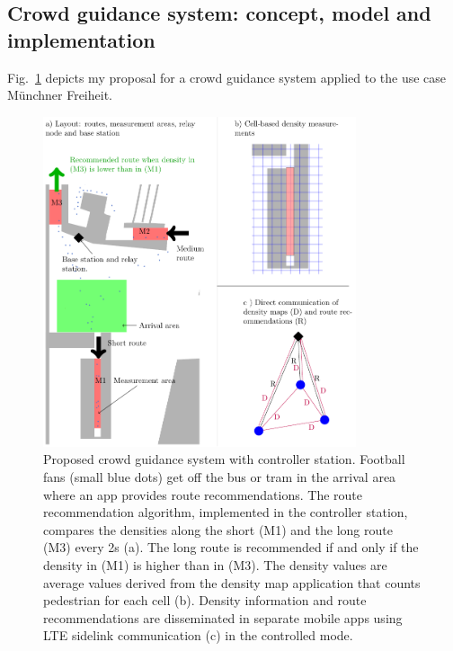 \subsection{Crowd guidance system: concept, model and implementation}

Fig.~\ref{fig:zentralesSzenario} depicts my proposal for a crowd guidance system applied to the use case Münchner Freiheit.  

\begin{figure}[hbt!]
\includegraphics[width=0.82\textwidth]{../figures/investigation/RealisticScenario/conceptFinal.pdf} 
\caption[Proposed crowd guidance system with relay station]{Proposed crowd guidance system with controller station. Football fans (small blue dots) get off the bus or tram in the arrival area where an app provides route recommendations. The route recommendation algorithm, implemented in the controller station, compares the densities along the short (M1) and the long route (M3) every 2s (a). The long route is recommended if and only if the density in (M1) is higher than in (M3). The density values are average values derived from the density map application that counts pedestrian for each cell (b). Density information and route recommendations are disseminated in separate mobile apps using LTE sidelink communication (c) in the controlled mode.}
\label{fig:zentralesSzenario}
\end{figure}

